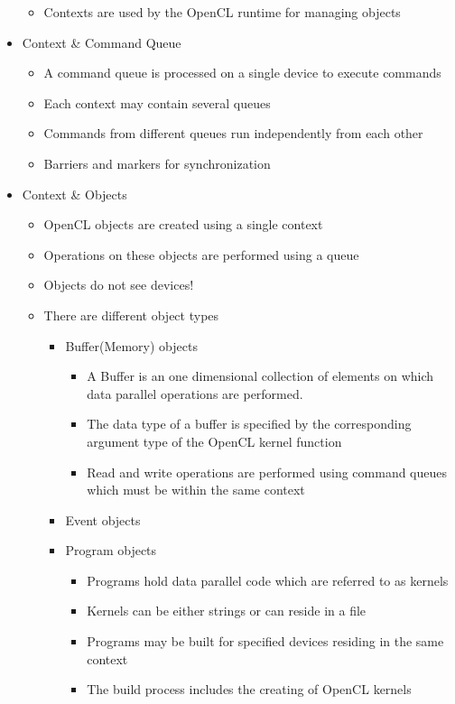 \documentclass[paper=a4, fontsize=11pt]{scrartcl} %
\numberwithin{equation}{section} %
\numberwithin{figure}{section} %
\numberwithin{table}{section} %
\begin{document}
\begin{itemize}
\begin{itemize}
    \item Contexts are used by the OpenCL runtime for managing objects
  \end{itemize}
  \item Context \& Command Queue
  \begin{itemize}
    \item A command queue is processed on a single device to execute commands
    \item Each context may contain several queues
    \item Commands from different queues run independently from each other
    \item Barriers and markers for synchronization
  \end{itemize}
  \item Context \& Objects
  \begin{itemize}
    \item OpenCL objects are created using a single context
    \item Operations on these objects are performed using a queue
    \item Objects do not see devices!
    \item There are different object types
    \begin{itemize}
      \item Buffer(Memory) objects
      \begin{itemize}
        \item A Buffer is an one dimensional collection of elements on which data parallel operations are performed.
        \item The data type of a buffer is specified by the corresponding argument type of the OpenCL kernel function
        \item Read and write operations are performed using command queues which must be within the same context
      \end{itemize}
      \item Event objects
      \item Program objects
      \begin{itemize}
        \item Programs hold data parallel code which are referred to as kernels
        \item Kernels can be either strings or can reside in a file
        \item Programs may be built for specified devices residing in the same context
        \item The build process includes the creating of OpenCL kernels

\end{itemize}
\end{itemize}
\end{itemize}
\end{itemize}
\end{document}
